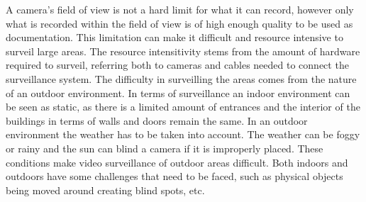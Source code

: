 
A camera's field of view is not a hard limit for what it can record, however only what is recorded within the field of view is of high enough quality to be used as documentation.
This limitation can make it difficult and resource intensive to surveil large areas.
The resource intensitivity stems from the amount of hardware required to surveil, referring both to cameras and cables needed to connect the surveillance system.
The difficulty in surveilling the areas comes from the nature of an outdoor environment.
In terms of surveillance an indoor environment can be seen as static, as there is a limited amount of entrances and the interior of the buildings in terms of walls and doors remain the same.
In an outdoor environment the weather has to be taken into account.
The weather can be foggy or rainy and the sun can blind a camera if it is improperly placed.
These conditions make video surveillance of outdoor areas difficult.
Both indoors and outdoors have some challenges that need to be faced, such as physical objects being moved around creating blind spots, etc.

